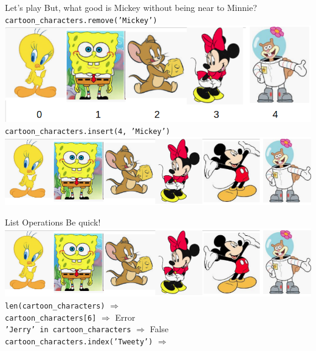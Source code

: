     \begin{frame} {Let's play}
        But, what good is Mickey without being near to Minnie?\\
        \pause
        \texttt{cartoon\_characters.remove('Mickey')}\\
        \includegraphics[width=.77\textwidth]{images/list_cartoons/list_after_remove.png}   
        \pause
        \texttt{cartoon\_characters.insert(4, 'Mickey')}\\
        \pause
        \includegraphics[width=.89\textwidth]{images/list_cartoons/list_after_insert.png}       
    \end{frame}

    \begin{frame}{List Operations}
        Be quick!\\
        \includegraphics[width=\textwidth]{images/list_cartoons/list_after_insert.png}     
        \texttt{len(cartoon\_characters)}  $\Rightarrow$ \\
        \pause \texttt{cartoon\_characters[6]}  $\Rightarrow$ \pause Error\\
        \pause \texttt{'Jerry' in cartoon\_characters}  $\Rightarrow$ \pause False\\
        \pause \texttt{cartoon\_characters.index('Tweety')}  $\Rightarrow$ \\
    \end{frame}

